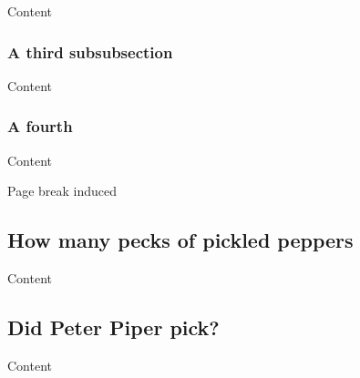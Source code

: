 \documentclass{article}
\begin{document}
Content

\subsubsection[\protect\miniorfulltoc{A \protect\emph{third} sub\protect\textcolor{blue}{sub}section \protect\textcolor{red}{$\Leftarrow$}\protect\mtocgobble}{}]{A third subsubsection}

Content

\subsubsection{A fourth}

Content

\vfill Page break induced
\newpage


\subsection[How many pecks]{How many pecks of pickled peppers}

Content

\subsection{Did Peter Piper pick?}

Content
\end{document}
